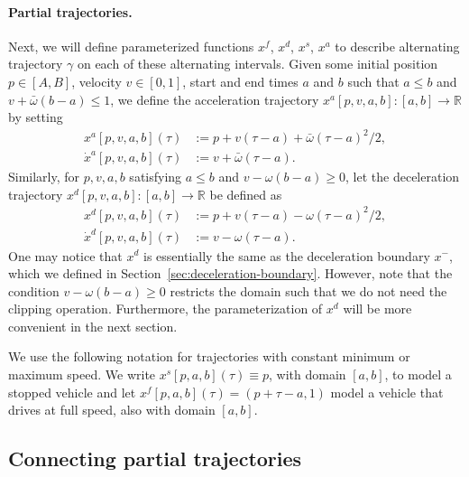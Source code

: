 \documentclass[a4paper]{report}
\theoremstyle{definition}
\theoremstyle{plain}
\begin{document}
\paragraph{Partial trajectories.}
Next, we will define parameterized functions $x^{f}$, $x^{d}$, $x^{s}$, $x^{a}$
to describe alternating trajectory $\gamma$ on each of these alternating intervals.
%
Given some initial position $p \in [A,B]$, velocity $v \in [0, 1]$, start and end times $a$ and
$b$ such that $a \leq b$ and $v + \bar{\omega}(b - a) \leq 1$, we define the acceleration
trajectory $x^{a}[p, v, a, b] : [a, b] \rightarrow \mathbb{R}$ by setting
\begin{subequations}
\begin{align}
  x^{a}[p,v,a,b](\tau) &:= p + v(\tau - a) + \bar{\omega} (\tau-a)^{2} / 2 , \\
  \dot{x}^{a}[p,v,a,b](\tau) &:= v + \bar{\omega} (\tau - a) .
\end{align}
\end{subequations}
%
Similarly, for $p, v, a, b$ satisfying $a \leq b$ and $v - \omega(b-a) \geq 0$,
let the deceleration trajectory
$x^{d}[p, v, a, b] : [a, b] \rightarrow \mathbb{R}$ be defined as
\begin{subequations}
\begin{align}
  x^{d}[p,v,a,b](\tau) &:= p + v (\tau - a) - \omega (\tau - a)^{2} / 2 , \\
  \dot{x}^{d}[p,v,a,b](\tau) &:= v - \omega (\tau - a) .
\end{align}
\end{subequations}
%
One may notice that $x^{d}$ is essentially the same as the deceleration boundary
$x^{-}$, which we defined in Section~\ref{sec:deceleration-boundary}. However, note that the condition $v - \omega(b-a) \geq 0$ restricts the domain such that we do not need the clipping operation. Furthermore, the parameterization of $x^{d}$ will be more convenient in the next section.

We use the following notation for trajectories with constant minimum or maximum
speed. We write $x^{s}[p, a, b](\tau) \equiv p$, with domain $[a,b]$, to model a stopped
vehicle and let $x^{f}[p, a, b](\tau) = (p + \tau - a, 1)$ model a vehicle that drives
at full speed, also with domain $[a,b]$.


\subsection{Connecting partial trajectories}
\end{document}
